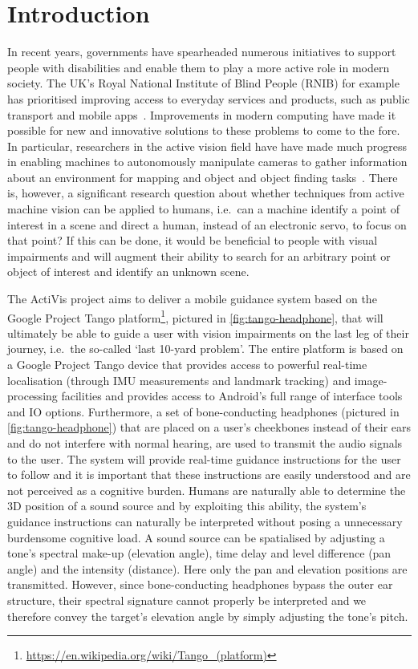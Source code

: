 \documentclass{llncs}
\begin{document}
\section{Introduction}

In recent years, governments have spearheaded numerous initiatives to support people with disabilities and enable them to play a more active role in modern society.
The UK's Royal National Institute of Blind People (RNIB) for example has prioritised improving access to everyday services and products, such as public transport and mobile apps~\cite{rnib2016uk}.
Improvements in modern computing have made it possible for new and innovative solutions to these problems to come to the fore.
In particular, researchers in the active vision field have have made much progress in enabling machines to autonomously manipulate cameras to gather information about an environment for mapping and object and object finding tasks~\cite{bajcsy2018revisiting}.
There is, however, a significant research question about whether techniques from active machine vision can be applied to humans, i.e.\ can a machine identify a point of interest in a scene and direct a human, instead of an electronic servo, to focus on that point?
If this can be done, it would be beneficial to people with visual impairments and will augment their ability to search for an arbitrary point or object of interest and identify an unknown scene. 

The ActiVis project aims to deliver a mobile guidance system based on the Google Project Tango platform\footnote{\url{https://en.wikipedia.org/wiki/Tango\_(platform)}}, pictured in \cref{fig:tango-headphone}, that will ultimately be able to guide a user with vision impairments on the last leg of their journey, i.e.\ the so-called `last 10-yard problem'. 
The entire platform is based on a Google Project Tango device that provides access to powerful real-time localisation (through IMU measurements and landmark tracking) and image-processing facilities and provides access to Android's full range of interface tools and IO options. 
Furthermore, a set of bone-conducting headphones (pictured in \cref{fig:tango-headphone}) that are placed on a user's cheekbones instead of their ears and do not interfere with normal hearing, are used to transmit the audio signals to the user.
The system will provide real-time guidance instructions for the user to follow and it is important that these instructions are easily understood and are not perceived as a cognitive burden. 
Humans are naturally able to determine the 3D position of a sound source and by exploiting this ability, the system's guidance instructions can naturally be interpreted without posing a unnecessary burdensome cognitive load.
A sound source can be spatialised by adjusting a tone's spectral make-up (elevation angle), time delay and level difference (pan angle) and the intensity (distance).
Here only the pan and elevation positions are transmitted.
However, since bone-conducting headphones bypass the outer ear structure, their spectral signature cannot properly be interpreted and we therefore convey the target's elevation angle by simply adjusting the tone's pitch.
\end{document}
